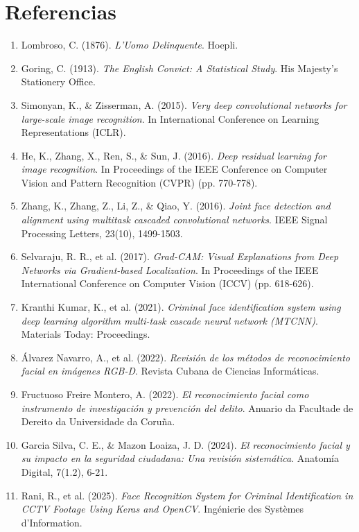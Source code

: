 \section{Referencias}

\begin{enumerate}
    \item Lombroso, C. (1876). \textit{L'Uomo Delinquente}. Hoepli.
    \item Goring, C. (1913). \textit{The English Convict: A Statistical Study}. His Majesty's Stationery Office.
    \item Simonyan, K., \& Zisserman, A. (2015). \textit{Very deep convolutional networks for large-scale image recognition}. In International Conference on Learning Representations (ICLR).
    \item He, K., Zhang, X., Ren, S., \& Sun, J. (2016). \textit{Deep residual learning for image recognition}. In Proceedings of the IEEE Conference on Computer Vision and Pattern Recognition (CVPR) (pp. 770-778).
    \item Zhang, K., Zhang, Z., Li, Z., \& Qiao, Y. (2016). \textit{Joint face detection and alignment using multitask cascaded convolutional networks}. IEEE Signal Processing Letters, 23(10), 1499-1503.
    \item Selvaraju, R. R., et al. (2017). \textit{Grad-CAM: Visual Explanations from Deep Networks via Gradient-based Localization}. In Proceedings of the IEEE International Conference on Computer Vision (ICCV) (pp. 618-626).
    \item Kranthi Kumar, K., et al. (2021). \textit{Criminal face identification system using deep learning algorithm multi-task cascade neural network (MTCNN)}. Materials Today: Proceedings.
    \item Álvarez Navarro, A., et al. (2022). \textit{Revisión de los métodos de reconocimiento facial en imágenes RGB-D}. Revista Cubana de Ciencias Informáticas.
    \item Fructuoso Freire Montero, A. (2022). \textit{El reconocimiento facial como instrumento de investigación y prevención del delito}. Anuario da Facultade de Dereito da Universidade da Coruña.
    \item Garcia Silva, C. E., \& Mazon Loaiza, J. D. (2024). \textit{El reconocimiento facial y su impacto en la seguridad ciudadana: Una revisión sistemática}. Anatomía Digital, 7(1.2), 6-21.
    \item Rani, R., et al. (2025). \textit{Face Recognition System for Criminal Identification in CCTV Footage Using Keras and OpenCV}. Ingénierie des Systèmes d'Information.
\end{enumerate}